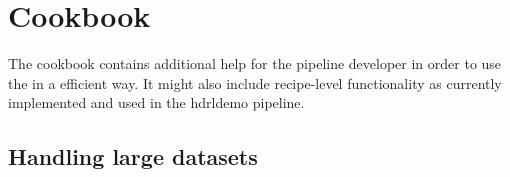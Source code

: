 \section{Cookbook}

The cookbook contains additional help for the pipeline developer in
order to use the \HDRL in a efficient way. It might also include
recipe-level functionality as currently implemented and used in the
hdrldemo pipeline.

\begingroup
\let\cleardoublepage\relax
\let\clearpage\relax

\subsection{Handling large datasets}
\label{sec:largedata:buffer}



%
%
%
%


\endgroup
%



